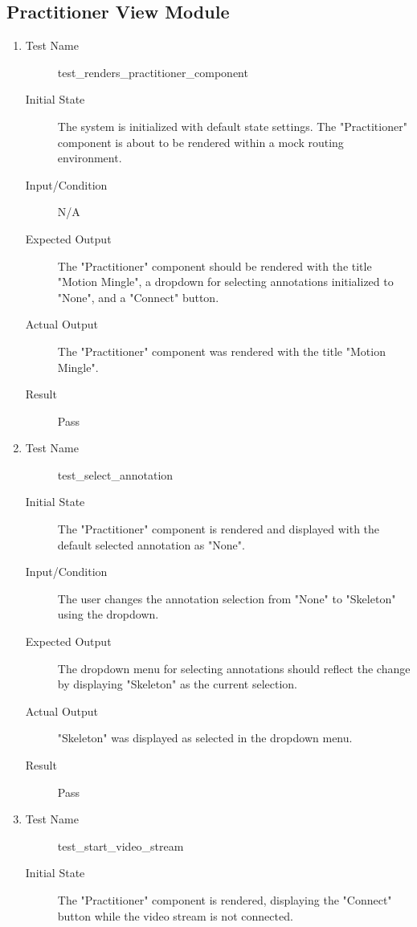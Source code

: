 \documentclass[12pt, titlepage]{article}
\begin{document}
\subsection{Practitioner View Module}
\begin{enumerate}[UT-PV1]
  \item \label{UT-PV1}
    \begin{description}
    \item[Test Name] test\_renders\_practitioner\_component
    \item[Initial State] The system is initialized with default state settings. The "Practitioner" component is about to be rendered within a mock routing environment.
    \item[Input/Condition] N/A
    \item[Expected Output] The "Practitioner" component should be rendered with the title "Motion Mingle", a dropdown for selecting annotations initialized to "None", and a "Connect" button.
    \item[Actual Output] The "Practitioner" component was rendered with the title "Motion Mingle".
    \item[Result] Pass
    \end{description}
  \item \label{UT-PV2}
    \begin{description}
    \item[Test Name] test\_select\_annotation
    \item[Initial State] The "Practitioner" component is rendered and displayed with the default selected annotation as "None".
    \item[Input/Condition] The user changes the annotation selection from "None" to "Skeleton" using the dropdown.
    \item[Expected Output] The dropdown menu for selecting annotations should reflect the change by displaying "Skeleton" as the current selection.
    \item[Actual Output] "Skeleton" was displayed as selected in the dropdown menu.
    \item[Result] Pass
    \end{description}
  \item \label{UT-PV3}
    \begin{description}
    \item[Test Name] test\_start\_video\_stream
    \item[Initial State] The "Practitioner" component is rendered, displaying the "Connect" button while the video stream is not connected.

\end{description}
\end{enumerate}
\end{document}

